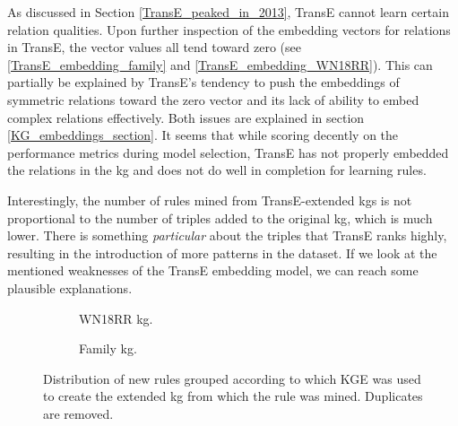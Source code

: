 As discussed in Section \ref{TransE_peaked_in_2013}, TransE cannot learn certain relation qualities. Upon further inspection of the embedding vectors for relations in TransE, the vector values all tend toward zero (see \ref{TransE_embedding_family} and \ref{TransE_embedding_WN18RR}). This can partially be explained by TransE's tendency to push the embeddings of symmetric relations toward the zero vector and its lack of ability to embed complex relations effectively. Both issues are explained in section \ref{KG_embeddings_section}. It seems that while scoring decently on the performance metrics during model selection, TransE has not properly embedded the relations in the \gls{kg} and does not do well in completion for learning rules.

Interestingly, the number of rules mined from TransE-extended \glspl{kg} is not proportional to the number of triples added to the original \gls{kg}, which is much lower. There is something \textit{particular} about the triples that TransE ranks highly, resulting in the introduction of more patterns in the dataset. If we look at the mentioned weaknesses of the TransE embedding model, we can reach some plausible explanations.

\begin{figure}[htb]
\centering
\begin{subfigure}{.5\textwidth}
  \centering
  
  \caption{WN18RR \gls{kg}.}
  \label{venn_wn18rr}
\end{subfigure}%
\begin{subfigure}{.5\textwidth}
  \centering
  
  \caption{Family \gls{kg}.}
  \label{venn_family}
\end{subfigure}
\caption[New rules grouped by KGEs]{Distribution of new rules grouped according to which KGE was used to create the extended \gls{kg} from which the rule was mined. Duplicates are removed.}
\label{venn}
\end{figure}

